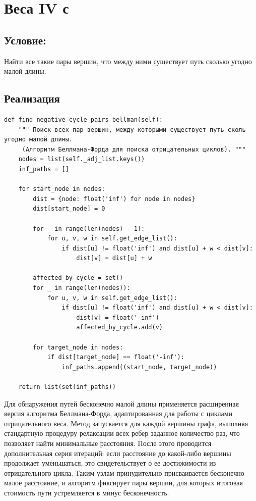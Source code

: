 \documentclass[referat]{SCWorks}
\begin{document}
    \section{Веса IV с}

    \subsection{Условие:} Найти все такие пары вершин, что между ними существует путь сколько угодно малой длины.

    \subsection{Реализация}

    \begin{verbatim}
def find_negative_cycle_pairs_bellman(self):
    """ Поиск всех пар вершин, между которыми существует путь сколь угодно малой длины.
     (Алгоритм Беллмана-Форда для поиска отрицательных циклов). """
    nodes = list(self._adj_list.keys())
    inf_paths = []

    for start_node in nodes:
        dist = {node: float('inf') for node in nodes}
        dist[start_node] = 0

        for _ in range(len(nodes) - 1):
            for u, v, w in self.get_edge_list():
                if dist[u] != float('inf') and dist[u] + w < dist[v]:
                    dist[v] = dist[u] + w

        affected_by_cycle = set()
        for _ in range(len(nodes)):
            for u, v, w in self.get_edge_list():
                if dist[u] != float('inf') and dist[u] + w < dist[v]:
                    dist[v] = float('-inf')
                    affected_by_cycle.add(v)

        for target_node in nodes:
            if dist[target_node] == float('-inf'):
                inf_paths.append((start_node, target_node))

    return list(set(inf_paths))
    \end{verbatim}

    Для обнаружения путей бесконечно малой длины применяется расширенная версия алгоритма Беллмана-Форда, адаптированная для работы с циклами отрицательного веса. Метод запускается для каждой вершины графа, выполняя стандартную процедуру релаксации всех ребер заданное количество раз, что позволяет найти минимальные расстояния. После этого проводится дополнительная серия итераций: если расстояние до какой-либо вершины продолжает уменьшаться, это свидетельствует о ее достижимости из отрицательного цикла. Таким узлам принудительно присваивается бесконечно малое расстояние, и алгоритм фиксирует пары вершин, для которых итоговая стоимость пути устремляется в минус бесконечность.
\end{document}
